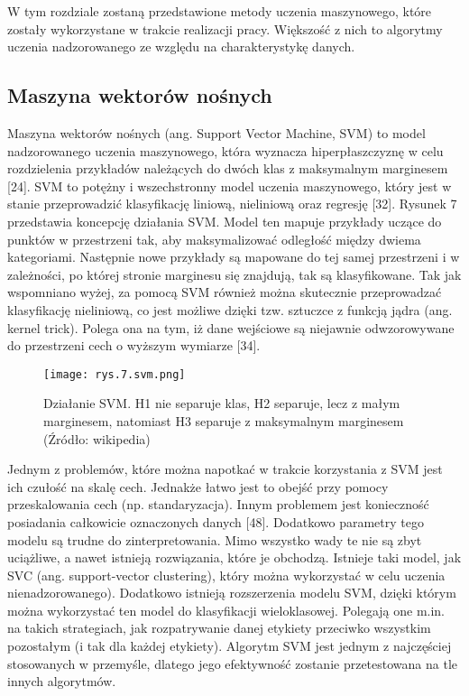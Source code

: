 W tym rozdziale zostaną przedstawione metody uczenia maszynowego, które zostały wykorzystane w trakcie realizacji pracy. Większość z nich to algorytmy uczenia nadzorowanego ze względu na charakterystykę danych.

\subsection{Maszyna wektorów nośnych}
\label{cha:Maszyna wektorów nośnych}

Maszyna wektorów nośnych (ang. Support Vector Machine, SVM) to model nadzorowanego uczenia maszynowego, która wyznacza hiperpłaszczyznę w celu rozdzielenia przykładów należących do dwóch klas z maksymalnym marginesem [24]. SVM to potężny i wszechstronny model uczenia maszynowego, który jest w stanie przeprowadzić klasyfikację liniową, nieliniową oraz regresję [32]. Rysunek 7 przedstawia koncepcję działania SVM. Model ten mapuje przykłady uczące do punktów w przestrzeni tak, aby maksymalizować odległość między dwiema kategoriami. Następnie nowe przykłady są mapowane do tej samej przestrzeni i w zależności, po której stronie marginesu się znajdują, tak są klasyfikowane. Tak jak wspomniano wyżej, za pomocą SVM również można skutecznie przeprowadzać klasyfikację nieliniową, co jest możliwe dzięki tzw. sztuczce z funkcją jądra (ang. kernel trick). Polega ona na tym, iż dane wejściowe są niejawnie odwzorowywane do przestrzeni cech o wyższym wymiarze [34]. 

\begin{figure}[h]
    \centering
    \texttt{[image: rys.7.svm.png]}
    \caption{Działanie SVM. H1 nie separuje klas, H2 separuje, lecz z małym marginesem, natomiast H3 separuje z maksymalnym marginesem (Źródło: wikipedia)}
    \label{fig:mesh7}
\end{figure}

Jednym z problemów, które można napotkać w trakcie korzystania z SVM jest ich czułość na skalę cech. Jednakże łatwo jest to obejść przy pomocy przeskalowania cech (np. standaryzacja). Innym problemem jest konieczność posiadania całkowicie oznaczonych danych [48]. Dodatkowo parametry tego modelu są trudne do zinterpretowania. Mimo wszystko wady te nie są zbyt uciążliwe, a nawet istnieją rozwiązania, które je obchodzą. Istnieje taki model, jak SVC (ang. support-vector clustering), który można wykorzystać w celu uczenia nienadzorowanego). Dodatkowo istnieją rozszerzenia modelu SVM, dzięki którym można wykorzystać ten model do klasyfikacji wieloklasowej. Polegają one m.in. na takich strategiach, jak rozpatrywanie danej etykiety przeciwko wszystkim pozostałym (i tak dla każdej etykiety). Algorytm SVM jest jednym z najczęściej stosowanych w przemyśle, dlatego jego efektywność zostanie przetestowana na tle innych algorytmów.

